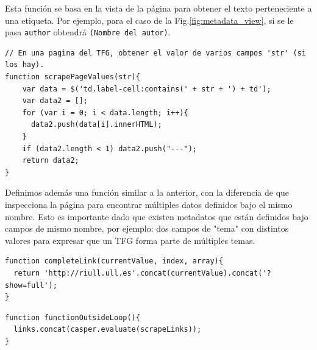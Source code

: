 Esta función se basa en la vista de la página para obtener el texto perteneciente a una etiqueta. Por ejemplo, para el caso de la Fig.\ref{fig:metadata_view}, si se le pasa \texttt{author} obtendrá \texttt{(Nombre del autor)}.


\begin{center}
\begin{minipage}{\linewidth}
\begin{lstlisting}[caption=Función de obtención de metadatos por nombre de etiqueta similar.]
// En una pagina del TFG, obtener el valor de varios campos 'str' (si los hay).
function scrapePageValues(str){
    var data = $('td.label-cell:contains(' + str + ') + td');
    var data2 = [];
    for (var i = 0; i < data.length; i++){
      data2.push(data[i].innerHTML);
    }
    if (data2.length < 1) data2.push("---");
    return data2;
}
\end{lstlisting}
\end{minipage}
\end{center}

Definimos además una función similar a la anterior, con la diferencia de que inspecciona la página para encontrar múltiples datos definidos bajo el mismo nombre. Esto es importante dado que existen metadatos que están definidos bajo campos de mismo nombre, por ejemplo: dos campos de "tema" con distintos valores para expresar que un TFG forma parte de múltiples temas.

\begin{center}
\begin{minipage}{\linewidth}
\begin{lstlisting}[caption=Función de concatenación de enlace.]
function completeLink(currentValue, index, array){
  return 'http://riull.ull.es'.concat(currentValue).concat('?show=full');
}
\end{lstlisting}
\end{minipage}
\end{center}


\begin{center}
\begin{minipage}{\linewidth}
\begin{lstlisting}[caption=Función tipo que permite la recurrencia con CasperJS.]
function functionOutsideLoop(){
  links.concat(casper.evaluate(scrapeLinks));
}
\end{lstlisting}
\end{minipage}
\end{center}
